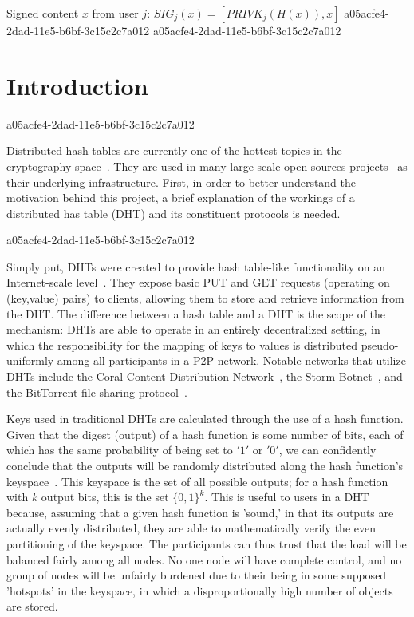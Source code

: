 \documentclass[12pt]{article}
\begin{document}
Signed content $x$ from user $j$: $SIG_j(x) = \left[ PRIVK_j( H(x) ), x \right]$
a05acfe4-2dad-11e5-b6bf-3c15c2c7a012
a05acfe4-2dad-11e5-b6bf-3c15c2c7a012\section{Introduction}
a05acfe4-2dad-11e5-b6bf-3c15c2c7a012\par Distributed hash tables are currently one of the hottest topics in the cryptography space~\cite{Stoica:2001dj,Rowstron:2001ea,Ratnasamy:2001wn}. They are used in many large scale open sources projects~\cite{Freitas:2013tb,Xu:2010vs,Perfitt:2010fh} as their underlying infrastructure. First, in order to better understand the motivation behind this project, a brief explanation of the workings of a distributed has table (DHT) and its constituent protocols is needed.

a05acfe4-2dad-11e5-b6bf-3c15c2c7a012\par Simply put, DHTs were created to provide hash table-like functionality on an Internet-scale level~\cite{Ratnasamy:2001wn}. They expose basic PUT and GET requests (operating on (key,value) pairs) to clients, allowing them to store and retrieve information from the DHT. The difference between a hash table and a DHT is the scope of the mechanism: DHTs are able to operate in an entirely decentralized setting, in which the responsibility for the mapping of keys to values is distributed pseudo-uniformly among all participants in a P2P network. Notable networks that utilize DHTs include the Coral Content Distribution Network~\cite{Freedman:2004vb}, the Storm Botnet~\cite{Holz:2008uk}, and the BitTorrent file sharing protocol~\cite{Cohen:y1_8mBnw}.

\par Keys used in traditional DHTs are calculated through the use of a hash function. Given that the digest (output) of a hash function is some number of bits, each of which has the same probability of being set to $'1'$ or $'0'$, we can confidently conclude that the outputs will be randomly distributed along the hash function's keyspace~. This keyspace is the set of all possible outputs; for a hash function with $k$ output bits, this is the set $\{0,1\}^k$. This is useful to users in a DHT because, assuming that a given hash function is 'sound,' in that its outputs are actually evenly distributed, they are able to mathematically verify the even partitioning of the keyspace. The participants can thus trust that the load will be balanced fairly among all nodes. No one node will have complete control, and no group of nodes will be unfairly burdened due to their being in some supposed 'hotspots' in the keyspace, in which a disproportionally high number of objects are stored.~
\end{document}

